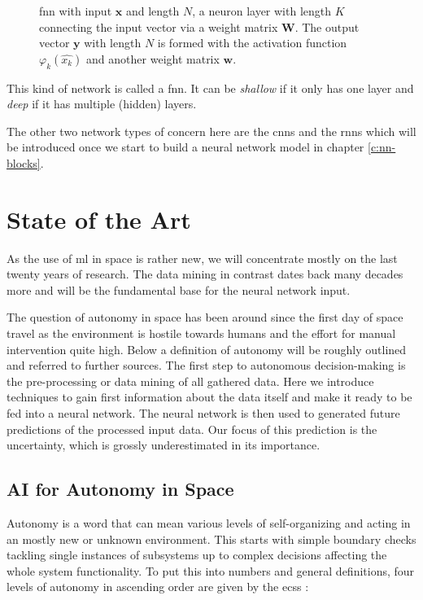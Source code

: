 \begin{figure}[htb]
\centering

\caption{\ac{fnn} with input $\mathbf{x}$ and length $N$, a neuron layer with length $K$ connecting the input vector via a weight matrix $\mathbf{W}$. The output vector $\mathbf{y}$ with length $N$ is formed with the activation function $\varphi_k(\hat{x_k})$ and another weight matrix $\mathbf{w}$.}
\label{f:nn_example}
\end{figure}

This kind of network is called a \ac{fnn}. It can be \textit{shallow} if it only has one layer and \textit{deep} if it has multiple (hidden) layers.

The other two network types of concern here are the \acp{cnn} \cite[p. 321ff]{deep-learning} and the \acp{rnn} \cite[p. 363ff]{deep-learning} which will be introduced once we start to build a neural network model in chapter \ref{c:nn-blocks}.

\section{State of the Art}
As the use of \ac{ml} in space is rather new, we will concentrate mostly on the last twenty years of research. The data mining in contrast dates back many decades more and will be the fundamental base for the neural network input.

The question of autonomy in space has been around since the first day of space travel as the environment is hostile towards humans and the effort for manual intervention quite high. \newline
Below a definition of autonomy will be roughly outlined and referred to further sources. The first step to autonomous decision-making is the pre-processing or data mining of all gathered data. Here we introduce techniques to gain first information about the data itself and make it ready to be fed into a neural network. The neural network is then used to generated future predictions of the processed input data. Our focus of this prediction is the uncertainty, which is grossly underestimated in its importance. 

\subsection{AI for Autonomy in Space}
Autonomy is a word that can mean various levels of self-organizing and acting in an mostly new or unknown environment. This starts with simple boundary checks tackling single instances of subsystems up to complex decisions affecting the whole system functionality. To put this into numbers and general definitions, four levels of autonomy in ascending order are given by the \ac{ecss} \cite{ecss-autonomy}:

